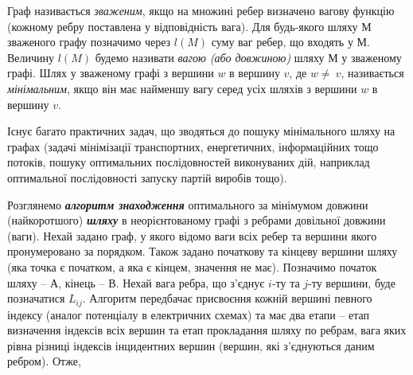 Граф називається \emph{зваженим}, якщо на множині ребер визначено вагову функцію (кожному ребру
поставлена у відповідність вага). Для будь-якого шляху $М$ зваженого графу позначимо через $l(M)$
суму ваг ребер, що входять у $М$. Величину $l(M)$ будемо називати \emph{вагою (або довжиною)} шляху
$М$ у зваженому графі. Шлях у зваженому графі з вершини $w$ в вершину $v$, де $w≠~v$,
називається \emph{мінімальним}, якщо він має найменшу вагу серед усіх шляхів з вершини $w$ в
вершину $v$.

Існує багато практичних задач, що зводяться до пошуку мінімального шляху на графах (задачі
мінімізації транспортних, енергетичних, інформаційних тощо потоків, пошуку оптимальних
послідовностей виконуваних дій, наприклад оптимальної послідовності запуску партій виробів тощо).

Розглянемо \textbf{\emph{алгоритм знаходження}} оптимального за мінімумом довжини (найкоротшого)
\textbf{\emph{шляху}} в неорієнтованому графі з ребрами довільної довжини (ваги). Нехай задано граф,
у якого відомо ваги всіх ребер та вершини якого пронумеровано за порядком. Також задано початкову та
кінцеву вершини шляху (яка точка є початком, а яка є кінцем, значення не має). Позначимо початок
шляху -- $А$, кінець -- $В$. Нехай вага ребра, що з'єднує $i$-ту та $j$-ту вершини, буде позначатися
$L_{ij}$. Алгоритм передбачає присвоєння кожній вершині певного індексу (аналог потенціалу в
електричних схемах) та має два етапи -- етап визначення індексів всіх вершин та етап прокладання
шляху по ребрам, вага яких рівна різниці індексів інцидентних вершин (вершин, які з'єднуються даним
ребром).  Отже,


